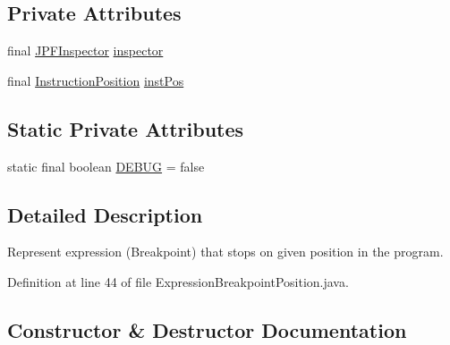 \subsection*{Private Attributes}
\begin{DoxyCompactItemize}
\item 
final \hyperlink{classgov_1_1nasa_1_1jpf_1_1inspector_1_1server_1_1jpf_1_1_j_p_f_inspector}{J\+P\+F\+Inspector} \hyperlink{classgov_1_1nasa_1_1jpf_1_1inspector_1_1server_1_1expression_1_1expressions_1_1_expression_breakpoint_position_a8a3d5dc750a8f629e27046cd30eb34f7}{inspector}
\item 
final \hyperlink{interfacegov_1_1nasa_1_1jpf_1_1inspector_1_1interfaces_1_1_instruction_position}{Instruction\+Position} \hyperlink{classgov_1_1nasa_1_1jpf_1_1inspector_1_1server_1_1expression_1_1expressions_1_1_expression_breakpoint_position_a8f9bc711f79a45ff712cbfb1253e677b}{inst\+Pos}
\end{DoxyCompactItemize}
\subsection*{Static Private Attributes}
\begin{DoxyCompactItemize}
\item 
static final boolean \hyperlink{classgov_1_1nasa_1_1jpf_1_1inspector_1_1server_1_1expression_1_1expressions_1_1_expression_breakpoint_position_a3169fb04f860dc378d6d7eaa14ffad35}{D\+E\+B\+UG} = false
\end{DoxyCompactItemize}


\subsection{Detailed Description}
Represent expression (Breakpoint) that stops on given position in the program. 

Definition at line 44 of file Expression\+Breakpoint\+Position.\+java.



\subsection{Constructor \& Destructor Documentation}
